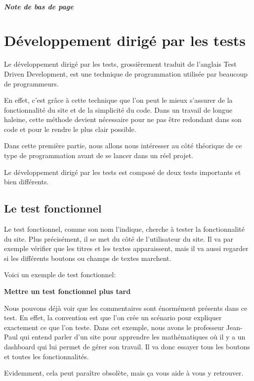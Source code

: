 \documentclass[letterpaper,10pt,french]{sphinxmanual}
\begin{document}
\paragraph{Note de bas de page}


\chapter{Développement dirigé par les tests}
\label{tdd::doc}\label{tdd:developpement-dirige-par-les-tests}
Le développement dirigé par les tests, grossièrement traduit de l'anglais Test
Driven Development, est une technique de programmation utilisée par beaucoup de
programmeurs.

En effet, c'est grâce à cette technique que l'on peut le mieux s'assurer de la
fonctionnalité du site et de la simplicité du code. Dans un travail de longue
haleine, cette méthode devient nécessaire pour ne pas être redondant dans son
code et pour le rendre le plus clair possible.

Dans cette première partie, nous allons nous intéresser au côté théorique de ce
type de programmation avant de se lancer dans un réel projet.

Le développement dirigé par les tests est composé de deux tests importants et
bien différents.


\section{Le test fonctionnel}
\label{tdd:le-test-fonctionnel}
Le test fonctionnel, comme son nom l'indique, cherche à tester la fonctionnalité
du site. Plus précisément, il se met du côté de l'utilisateur du site. Il va par
exemple vérifier que les titres et les textes apparaissent, mais il va aussi
regarder si les différents boutons ou champs de textes marchent.

Voici un exemple de test fonctionnel:

\textbf{Mettre un test fonctionnel plus tard}

Nous pouvons déjà voir que les commentaires sont énormément présents dans ce
test. En effet, la convention est que l'on crée un scénario pour expliquer
exactement ce que l'on teste. Dans cet exemple, nous avons le professeur
Jean-Paul qui entend parler d'un site pour apprendre les mathématiques où il y a
un dashboard qui lui permet de gérer son travail. Il va donc essayer
tous les boutons et toutes les fonctionnalités.

Evidemment, cela peut paraître obsolète, mais ça vous aide à vous y retrouver.
\end{document}
